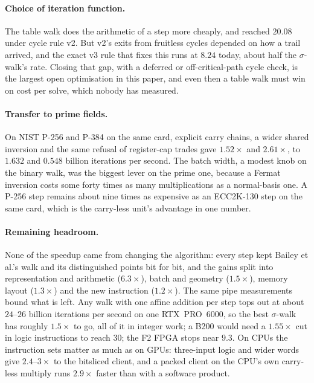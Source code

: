\paragraph{Choice of iteration function.} The table walk
does the arithmetic of a step more cheaply, and reached $20.08$ under
cycle rule v2. But v2's exits from fruitless cycles depended on how a
trail arrived, and the exact v3 rule that fixes this runs at $8.24$
today, about half the $\sigma$-walk's rate. Closing that gap, with a deferred or off-critical-path cycle
check, is the largest open optimisation in this paper, and even then a
table walk must win on cost per solve, which nobody has measured.

\paragraph{Transfer to prime fields.} On NIST P-256 and P-384 on the same card, explicit carry
chains, a wider shared inversion and the same refusal of register-cap
trades gave $1.52\times$ and $2.61\times$, to $1.632$ and $0.548$ billion
iterations per second. The batch width, a modest knob on the binary
walk, was the biggest lever on the prime one, because a Fermat
inversion costs some forty times as many multiplications as a
normal-basis one. A P-256 step remains about nine times as expensive
as an ECC2K-130 step on the same card, which is the carry-less unit's
advantage in one number.

\paragraph{Remaining headroom.} None of the speedup
came from changing the algorithm: every step kept Bailey et al.'s walk
and its distinguished points bit for bit, and the gains split into
representation and arithmetic ($6.3\times$), batch and geometry
($1.5\times$), memory layout ($1.3\times$) and the new instruction
($1.2\times$). The same pipe measurements bound what is left. Any walk with
one affine addition per step tops out at about $24$--$26$ billion
iterations per second on one RTX~PRO~6000, so the best $\sigma$-walk has
roughly $1.5\times$ to go, all of it in integer work; a B200 would need a
$1.55\times$ cut in logic instructions to reach $30$; the F2 FPGA stops near
$9.3$. On CPUs the instruction sets matter as much as on GPUs: three-input
logic and wider words give $2.4$--$3\times$ to the bitsliced client, and a
packed client on the CPU's own carry-less multiply runs $2.9\times$ faster
than with a software product.

